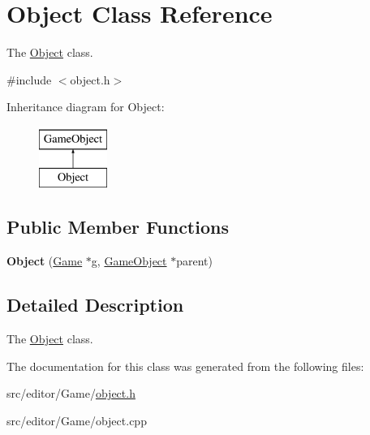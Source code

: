 \hypertarget{class_object}{\section{\-Object \-Class \-Reference}
\label{class_object}
}


\-The \hyperlink{class_object}{\-Object} class.  




{\ttfamily \#include $<$object.\-h$>$}

\-Inheritance diagram for \-Object\-:\begin{figure}[H]
\begin{center}
\leavevmode
\includegraphics[height=2.000000cm]{class_object}
\end{center}
\end{figure}
\subsection*{\-Public \-Member \-Functions}
\begin{DoxyCompactItemize}
\item 
\hypertarget{class_object_a5e05d43825eadd0b6868544c22bc4269}{{\bfseries \-Object} (\hyperlink{class_game}{\-Game} $\ast$g, \hyperlink{class_game_object}{\-Game\-Object} $\ast$parent)}\label{class_object_a5e05d43825eadd0b6868544c22bc4269}

\end{DoxyCompactItemize}


\subsection{\-Detailed \-Description}
\-The \hyperlink{class_object}{\-Object} class. 

\-The documentation for this class was generated from the following files\-:\begin{DoxyCompactItemize}
\item 
src/editor/\-Game/\hyperlink{object_8h}{object.\-h}\item 
src/editor/\-Game/object.\-cpp\end{DoxyCompactItemize}
